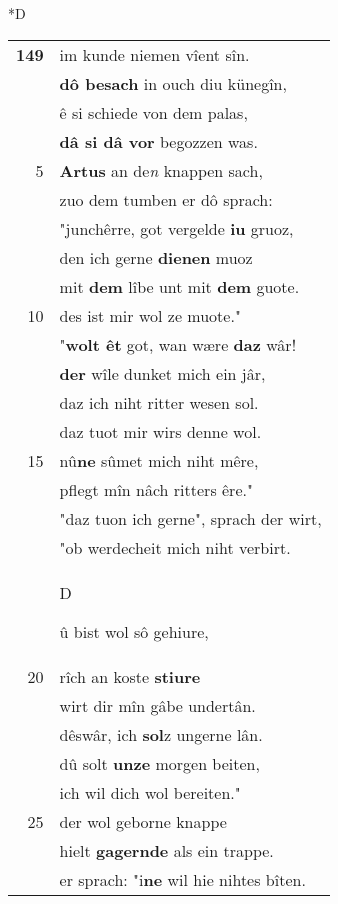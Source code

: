 \documentclass[8pt,a4paper,notitlepage]{article}
\begin{document}
\begin{table}[ht]
\begin{minipage}[t]{0.5\linewidth}
\small
\begin{center}*D
\end{center}
\begin{tabular}{rl}
\textbf{149} & im kunde niemen vîent sîn.\\ 
 & \textbf{dô besach} in ouch diu künegîn,\\ 
 & ê si schiede von dem palas,\\ 
 & \textbf{dâ si dâ vor} begozzen was.\\ 
5 & \textbf{Artus} an de\textit{n} knappen sach,\\ 
 & zuo dem tumben er dô sprach:\\ 
 & "junchêrre, got vergelde \textbf{iu} gruoz,\\ 
 & den ich gerne \textbf{dienen} muoz\\ 
 & mit \textbf{dem} lîbe unt mit \textbf{dem} guote.\\ 
10 & des ist mir wol ze muote."\\ 
 & "\textbf{wolt êt} got, wan wære \textbf{daz} wâr!\\ 
 & \textbf{der} wîle dunket mich ein jâr,\\ 
 & daz ich niht ritter wesen sol.\\ 
 & daz tuot mir wirs denne wol.\\ 
15 & nû\textbf{ne} sûmet mich niht mêre,\\ 
 & pflegt mîn nâch ritters êre."\\ 
 & "daz tuon ich gerne", sprach der wirt,\\ 
 & "ob werdecheit mich niht verbirt.\\ 
 & \begin{large}D\end{large}û bist wol sô gehiure,\\ 
20 & rîch an koste \textbf{stiure}\\ 
 & wirt dir mîn gâbe undertân.\\ 
 & dêswâr, ich \textbf{sol}z ungerne lân.\\ 
 & dû solt \textbf{unze} morgen beiten,\\ 
 & ich wil dich wol bereiten."\\ 
25 & der wol geborne knappe\\ 
 & hielt \textbf{gagernde} als ein trappe.\\ 
 & er sprach: "i\textbf{ne} wil hie nihtes bîten.\\ 

\end{tabular}
\end{minipage}
\end{table}
\end{document}
